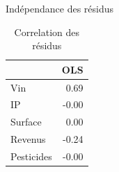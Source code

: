 \documentclass[11pt,ignorenonframetext,]{beamer}
\begin{document}
\begin{frame}{Indépendance des résidus}
\protect\hypertarget{independance-des-residus}{}

\tiny

\begin{table}[ht]
\centering
\begin{tabular}{l|r}
  \hline
 & OLS \\ 
  \hline
Vin & 0.69 \\ 
  IP & -0.00 \\ 
  Surface & 0.00 \\ 
  Revenus & -0.24 \\ 
  Pesticides & -0.00 \\ 
   \hline
\end{tabular}
\caption{Correlation des résidus} 
\end{table}

\normalsize

\end{frame}
\end{document}
